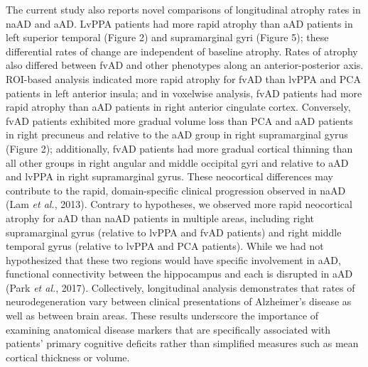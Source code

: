 \documentclass[]{article}
\begin{document}
The current study also reports novel comparisons of longitudinal atrophy
rates in naAD and aAD. LvPPA patients had more rapid atrophy than aAD
patients in left superior temporal (Figure 2) and supramarginal gyri
(Figure 5); these differential rates of change are independent of
baseline atrophy. Rates of atrophy also differed between fvAD and other
phenotypes along an anterior-posterior axis. ROI-based analysis
indicated more rapid atrophy for fvAD than lvPPA and PCA patients in
left anterior insula; and in voxelwise analysis, fvAD patients had more
rapid atrophy than aAD patients in right anterior cingulate cortex.
Conversely, fvAD patients exhibited more gradual volume loss than PCA
and aAD patients in right precuneus and relative to the aAD group in
right supramarginal gyrus (Figure 2); additionally, fvAD patients had
more gradual cortical thinning than all other groups in right angular
and middle occipital gyri and relative to aAD and lvPPA in right
supramarginal gyrus. These neocortical differences may contribute to the
rapid, domain-specific clinical progression observed in naAD (Lam
\emph{et al.}, 2013). Contrary to hypotheses, we observed more rapid
neocortical atrophy for aAD than naAD patients in multiple areas,
including right supramarginal gyrus (relative to lvPPA and fvAD
patients) and right middle temporal gyrus (relative to lvPPA and PCA
patients). While we had not hypothesized that these two regions would
have specific involvement in aAD, functional connectivity between the
hippocampus and each is disrupted in aAD (Park \emph{et al.}, 2017).
Collectively, longitudinal analysis demonstrates that rates of
neurodegeneration vary between clinical presentations of Alzheimer's
disease as well as between brain areas. These results underscore the
importance of examining anatomical disease markers that are specifically
associated with patients' primary cognitive deficits rather than
simplified measures such as mean cortical thickness or volume.
\end{document}
